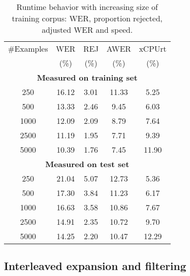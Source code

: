 \documentclass[11pt]{article}
\begin{document}
\begin{table}[h]
\begin{tabular}{|c||c|c|c|c|}
\hline
\#Examples 	&WER	&REJ	&AWER	&xCPUrt	\\
		&(\%)	&(\%)	&(\%)	&(\%)	\\
\hline	
\hline	
\multicolumn{5}{|c|}{\bf Measured on training set}\\
\hline
250		&16.12	&3.01	&11.33	&5.25	\\
\hline						
500		&13.33	&2.46	&9.45	&6.03	\\
\hline						
1000		&12.09	&2.09	&8.79	&7.64	\\
\hline						
2500		&11.19	&1.95	&7.71	&9.39	\\
\hline						
5000		&10.39	&1.76	&7.45	&11.90	\\
\hline						
\multicolumn{5}{|c|}{\bf Measured on test set}\\
\hline
250		&21.04	&5.07	&12.73	&5.36	\\
\hline						
500		&17.30	&3.84	&11.23	&6.17	\\
\hline						
1000		&16.63	&3.58	&10.86	&7.67	\\
\hline						
2500		&14.91	&2.35	&10.72	&9.70	\\
\hline						
5000		&14.25	&2.20	&10.47	&12.29	\\
\hline						
\end{tabular}
\caption{Runtime behavior with increasing size of training corpus:
WER, proportion rejected, adjusted WER and speed.}
\label{Table:CorpusScalability}
\end{table}


%
%
%
\subsection{Interleaved expansion and filtering}
\label{Section:IterativeExpansion}
\end{document}
